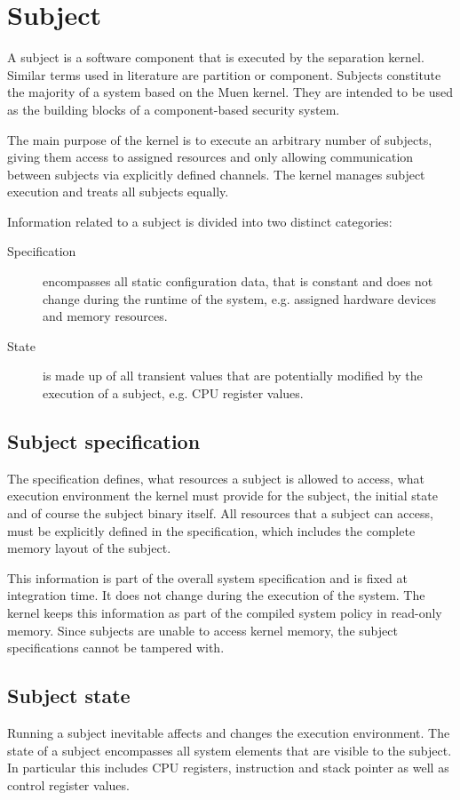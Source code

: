 \section{Subject}\label{sec:design-subject}
A subject is a software component that is executed by the separation
kernel. Similar terms used in literature are partition or component. Subjects
constitute the majority of a system based on the Muen kernel. They are intended
to be used as the building blocks of a component-based security system.

The main purpose of the kernel is to execute an arbitrary number of subjects,
giving them access to assigned resources and only allowing communication between
subjects via explicitly defined channels. The kernel manages subject execution
and treats all subjects equally.

Information related to a subject is divided into two distinct categories:

\begin{description}
	\item[Specification] encompasses all static configuration data, that is
		constant and does not change during the runtime of the system, e.g.
		assigned hardware devices and memory resources.
	\item[State] is made up of all transient values that are potentially
		modified by the execution of a subject, e.g. CPU register values.
\end{description}

\subsection{Subject specification}
The specification defines, what resources a subject is allowed to access, what
execution environment the kernel must provide for the subject, the initial
state and of course the subject binary itself. All resources that a subject can
access, must be explicitly defined in the specification, which includes the
complete memory layout of the subject.

This information is part of the overall system specification and is fixed at
integration time. It does not change during the execution of the system. The
kernel keeps this information as part of the compiled system policy in read-only
memory. Since subjects are unable to access kernel memory, the subject
specifications cannot be tampered with.

\subsection{Subject state}
Running a subject inevitable affects and changes the execution environment. The
state of a subject encompasses all system elements that are visible to the
subject. In particular this includes CPU registers, instruction and stack
pointer as well as control register values.

